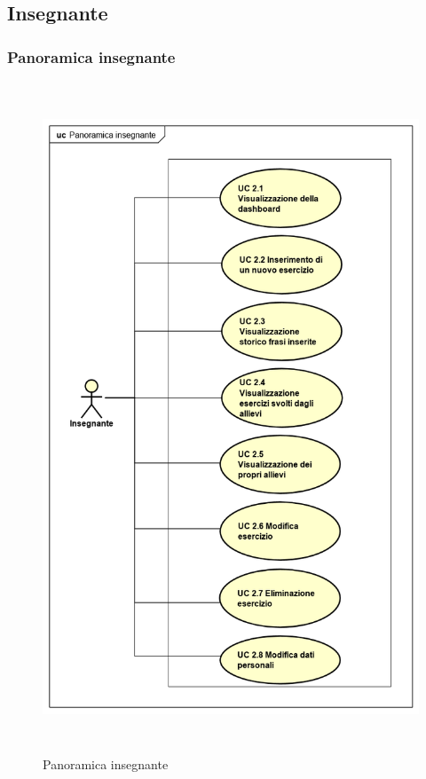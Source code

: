 \subsection{Insegnante}

\subsubsection{Panoramica insegnante}
\begin{figure}[H]
\centering
\includegraphics[width=17cm, height=20cm]{img/PanoramicaInsegnanti.png} 
\caption{Panoramica insegnante}
\end{figure}


